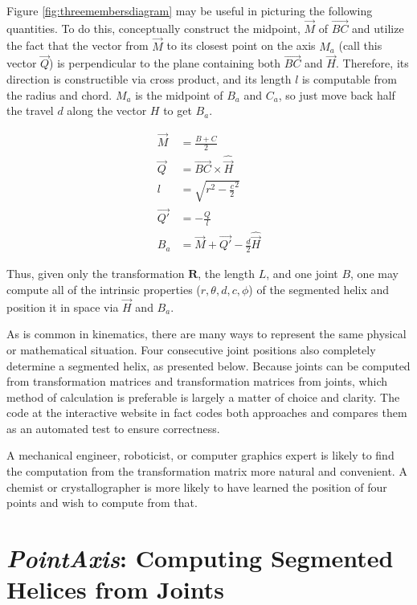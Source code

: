 \documentclass[11pt]{article}
\begin{document}
{Figure \ref{fig:threemembersdiagram}
may be useful in picturing the following quantities.
To do this, conceptually construct the midpoint,
$\overrightarrow{M}$
of $\overrightarrow{BC}$ and utilize the fact that the vector
from $\overrightarrow{M}$ to its closest point on the axis $M_a$ (call this vector $\overrightarrow{Q}$) is perpendicular
to the plane containing both $\overrightarrow{BC}$ and $\overrightarrow{H}$. Therefore,
its direction is constructible via cross product, and
its length $l$ is computable from the radius and chord. $M_a$
is the midpoint of $B_a$ and $C_a$, so just move back
half the travel $d$ along the vector $H$ to get $B_a$.

\begin{align}
  \overrightarrow{M} &= \frac{B + C}{2} \\
  \overrightarrow{Q} &= \overrightarrow{BC} \times \hat{\overrightarrow{H}} \\
  l &= \sqrt{r^2 - \frac{c}{2}^2} \\
  \overrightarrow{Q'} &= -\frac{Q}{l} \\
  B_a &= \overrightarrow{M} + \overrightarrow{Q'} - \frac{d}{2}\hat{\overrightarrow{H}}
\end{align}

Thus, given only the transformation $\bm{R}$, the length $L$, and one
joint $B$, one may compute all of the intrinsic properties
($r,\theta,d,c,\phi$) of
the segmented helix and position it in space via $\overrightarrow{H}$ and $B_a$.

As is common in kinematics\cite{funda1990computational}, there are many ways to represent
the same physical or mathematical situation.
Four consecutive joint positions also completely determine a segmented helix, as presented below.
Because joints can be computed from transformation
matrices and transformation matrices from joints,
which method of calculation is preferable is largely
a matter of choice and clarity.
The code at the interactive website
in fact codes both approaches and compares them as an automated test to ensure
correctness.

A mechanical engineer, roboticist, or computer graphics expert is
likely to find the computation from the
transformation matrix more natural and convenient.
A chemist or crystallographer is more likely to
have learned the position of four points and wish to compute from that.

\section{{\em PointAxis}: Computing Segmented Helices from Joints}
\label{sec:pointaxis}

}
\end{document}
